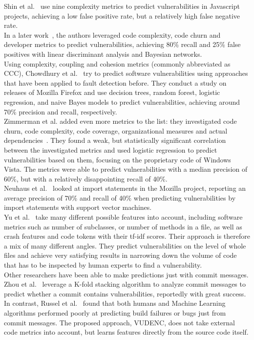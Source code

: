 \documentclass[
a4paper,
pagesize,
pdftex,
12pt,
ngerman,
fleqn,
final,
]{scrartcl}
\begin{document}
	Shin et al.~\cite{Shin.2008} use nine complexity metrics to predict vulnerabilities in Javascript projects, achieving a low false positive rate, but a relatively high false negative rate.\\
	In a later work~\cite{Shin.2010}, the authors leveraged code complexity, code churn and developer metrics to predict vulnerabilities, achieving 80\% recall and 25\% false positives with linear discriminant analysis and Bayesian networks. \\
	Using complexity, coupling and cohesion metrics (commonly abbreviated as CCC), Chowdhury et al.~\cite{Chowdhury.2011} try to predict software vulnerabilities using approaches that have been applied to fault detection before. They conduct a study on releases of Mozilla Firefox and use decision trees, random forest, logistic regression, and naive Bayes models to predict vulnerabilities, achieving around 70\% precision and recall, respectively. \\
	Zimmerman et al. added even more metrics to the list: they investigated code churn, code complexity, code coverage, organizational measures and actual dependencies~\cite{Zimmermann.2010}. They found a weak, but statistically significant correlation between the investigated metrics and used logistic regression to predict vulnerabilities based on them, focusing on the proprietary code of Windows Vista. The metrics were able to predict vulnerabilities with a median precision of 60\%, but with a relatively disappointing recall of 40\%. \\
	Neuhaus et al.~\cite{Neuhaus.2007} looked at import statements in the Mozilla project, reporting an average precision of 70\% and recall of 40\% when predicting vulnerabilities by import statements with support vector machines. \\
	Yu et al.~\cite{Yu.2019} take many different possible features into account, including software metrics such as number of subclasses, or number of methods in a file, as well as crash features and code tokens with their tf-idf scores. Their approach is therefore a mix of many different angles. They predict vulnerabilities on the level of whole files and achieve very satisfying results in narrowing down the volume of code that has to be inspected by human experts to find a vulnerability.\\
	Other researchers have been able to make predictions just with commit messages. Zhou et al.~\cite{Zhou.2017} leverage a K-fold stacking algorithm to analyze commit messages to predict whether a commit contains vulnerabilities, reportedly with great success. In contrast, Russel et al.~\cite{Russell.2018} found that both humans and Machine Learning algorithms performed poorly at predicting build failures or bugs just from commit messages.
	The proposed approach, VUDENC, does not take external code metrics into account, but learns features directly from the source code itself. 
	
\end{document}
